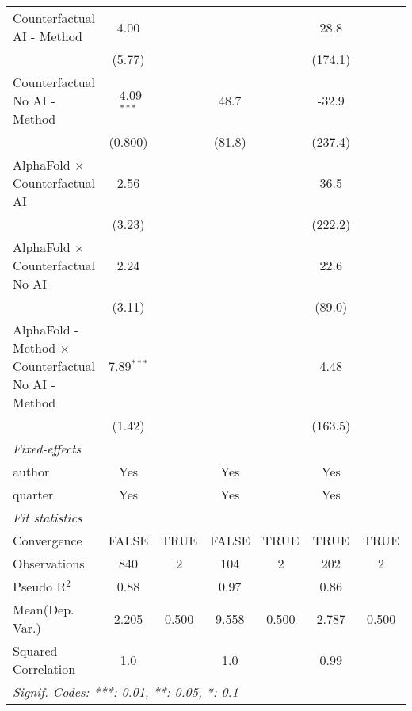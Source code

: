 \begin{tabular}{lcccccc}
   Counterfactual AI - Method                                 & 4.00          &      &             &      & 28.8    &   \\   
                                                              & (5.77)        &      &             &      & (174.1) &   \\   
   Counterfactual No AI - Method                              & -4.09$^{***}$ &      & 48.7        &      & -32.9   &   \\   
                                                              & (0.800)       &      & (81.8)      &      & (237.4) &   \\   
   AlphaFold $\times$ Counterfactual AI                       & 2.56          &      &             &      & 36.5    &   \\   
                                                              & (3.23)        &      &             &      & (222.2) &   \\   
   AlphaFold $\times$ Counterfactual No AI                    & 2.24          &      &             &      & 22.6    &   \\   
                                                              & (3.11)        &      &             &      & (89.0)  &   \\   
   AlphaFold - Method $\times$ Counterfactual No AI - Method  & 7.89$^{***}$  &      &             &      & 4.48    &   \\   
                                                              & (1.42)        &      &             &      & (163.5) &   \\   
   \midrule
   \emph{Fixed-effects}\\
   author                                                     & Yes           &      & Yes         &      & Yes     & \\  
   quarter                                                    & Yes           &      & Yes         &      & Yes     & \\  
   \midrule
   \emph{Fit statistics}\\
   Convergence                                                &FALSE          & TRUE & FALSE       & TRUE & TRUE    & TRUE\\  
   Observations                                               & 840           & 2    & 104         & 2    & 202     & 2\\  
   Pseudo R$^2$                                               & 0.88          &      & 0.97        &      & 0.86    & \\  
Mean(Dep. Var.) & 2.205 & 0.500 & 9.558 & 0.500 & 2.787 & 0.500 \\
   Squared Correlation                                        & 1.0           &      & 1.0         &      & 0.99    & \\  
   \midrule \midrule
   \multicolumn{7}{l}{\emph{Signif. Codes: ***: 0.01, **: 0.05, *: 0.1}}\\
\end{tabular}
\par\endgroup
